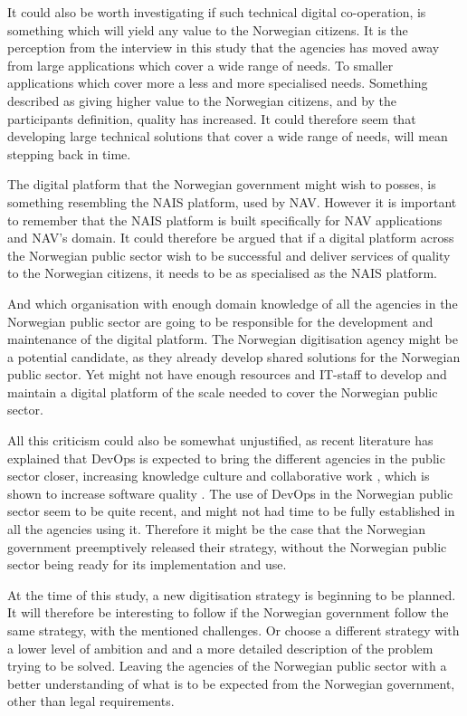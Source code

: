 It could also be worth investigating if such technical digital co-operation, is something which will yield any value to the Norwegian citizens. It is the perception from the interview in this study that the agencies has moved away from large applications which cover a wide range of needs. To smaller applications which cover more a less and more specialised needs. Something described as giving higher value to the Norwegian citizens, and by the participants definition, quality has increased. It could therefore seem that developing large technical solutions that cover a wide range of needs, will mean stepping back in time.

The digital platform that the Norwegian government might wish to posses, is something resembling the NAIS platform, used by NAV. However it is important to remember that the NAIS platform is built specifically for NAV applications and NAV's domain. It could therefore be argued that if a digital platform across the Norwegian public sector wish to be successful and deliver services of quality to the Norwegian citizens, it needs to be as specialised as the NAIS platform. 

And which organisation with enough domain knowledge of all the agencies in the Norwegian public sector are going to be responsible for the development and maintenance of the digital platform. The Norwegian digitisation agency might be a potential candidate, as they already develop shared solutions for the Norwegian public sector. Yet might not have enough resources and IT-staff to develop and maintain a digital platform of the scale needed to cover the Norwegian public sector. 

All this criticism could also be somewhat unjustified, as recent literature has explained that DevOps is expected to bring the different agencies in the public sector closer, increasing knowledge culture and collaborative work \cite{mm_2021}, which is shown to increase software quality \cite{smm_2018}. The use of DevOps in the Norwegian public sector seem to be quite recent, and might not had time to be fully established in all the agencies using it. Therefore it might be the case that the Norwegian government preemptively released their strategy, without the Norwegian public sector being ready for its implementation and use.

At the time of this study, a new digitisation strategy is beginning to be planned. It will therefore be interesting to follow if the Norwegian government follow the same strategy, with the mentioned challenges. Or choose a different strategy with a lower level of ambition and and a more detailed description of the problem trying to be solved. Leaving the agencies of the Norwegian public sector with a better understanding of what is to be expected from the Norwegian government, other than legal requirements.

